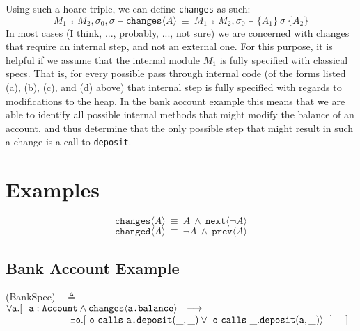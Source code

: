 \documentclass[12pt]{article}
\begin{document}
Using such a hoare triple, we can define \texttt{changes} as such:
$$M_1\ \fcmp\ M_	2, \sigma_0, \sigma \vDash \texttt{changes}\langle A \rangle\ \equiv\ M_1\ \fcmp\ M_2, \sigma_0 \vDash \{A_1\}\ \sigma\ \{ A_2\}$$
In most cases (I think, ..., probably, ..., not sure) we are concerned with changes that require an internal step, and not an external one. For this purpose, 
it is helpful if we assume that the internal module $M_1$ is fully specified with classical specs. That is, for every possible pass through internal code 
(of the forms listed (a), (b), (c), and (d) above) that internal step is fully specified with regards to modifications to the heap. In the bank account example
this means that we are able to identify all possible internal methods that might modify the balance of an account, and thus determine that the only 
possible step that might result in such a change is a call to \texttt{deposit}.

\section{Examples}


$$\texttt{changes}\langle A \rangle\ \equiv\ A\ \wedge\ \texttt{next}\langle \neg A \rangle$$
$$\texttt{changed}\langle A \rangle\ \equiv\ \neg A\ \wedge\ \texttt{prev}\langle A \rangle$$


\subsection{Bank Account Example}
 
  \vspace{.01in}
(BankSpec)\ \  $\triangleq$\\ 
$\forall \texttt{a}.[\ \ \texttt{a}:\texttt{Account} \wedge \texttt{changes}\langle{\texttt{a.balance}}\rangle  \ \    
    \longrightarrow \ \    \hfill$ \\
  $\strut \hspace{2.3cm} 
  \exists \texttt{o}. [\    \texttt{o}\ \texttt{calls}\ {\texttt{a.}}{\texttt{deposit}}({\_,\_}) \vee\  \texttt{o}\ \texttt{calls}\ {\_.}{\texttt{deposit}}({\texttt{a},\_})\rangle\  \ ] \ \ \ \ ] \hfill $
\vspace{.05in}
\end{document}

